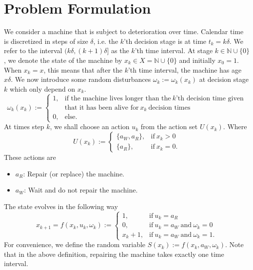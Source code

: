 \section{Problem Formulation}
We consider a machine that is subject to deterioration over time.
Calendar time is discretized in steps of size $\delta$, i.e. the $k$'th decision stage is at time $t_k=k\delta$.
We refer to the interval $(k\delta,(k+1)\delta]$ as the $k$'th time interval.
At stage $k\in\mathbb{N}\cup\{0\}$, we denote the state of the machine by $x_k\in X=\mathbb{N}\cup\{0\}$ and initially $x_0=1$.
When $x_k=x$, this means that after the $k$'th time interval, the machine has age $x\delta$.
We now introduce some random disturbances $\omega_k:=\omega_k(x_k)$ at decision stage $k$ which only depend on $x_k$.
\begin{equation}
\omega_k(x_k):=\begin{cases}
1,&\text{if the machine lives longer than the}\ k\text{'th decision time given}\\
&\text{that it has been alive for}\ x_k\ \text{decision times} \\
0,&\text{else}.
\end{cases}
\end{equation}
At times step $k$, we shall choose an action $u_k$ from the action set $U(x_k)$.
Where
\begin{equation}
U(x_k):=\begin{cases}
\{a_W,a_R\},&\text{if}\ x_k>0 \\
\{a_R\},&\text{if}\ x_k=0.
\end{cases}
\end{equation}
These actions are
\begin{itemize}
\item $a_R$:
Repair (or replace) the machine.
\item $a_W$:
Wait and do not repair the machine.
\end{itemize}
The state evolves in the following way
\begin{equation}
x_{k+1}=f(x_k,u_k,\omega_k):=\begin{cases}
1,&\text{if}\ u_k=a_R \\
0,&\text{if}\ u_k=a_W\ \text{and}\ \omega_k=0 \\
x_k+1,&\text{if}\ u_k=a_W\ \text{and}\ \omega_k=1.
\end{cases}
\end{equation}
For convenience, we define the random variable $S(x_k):=f(x_k,a_W,\omega_k)$.
Note that in the above definition, repairing the machine takes exactly one time interval.
